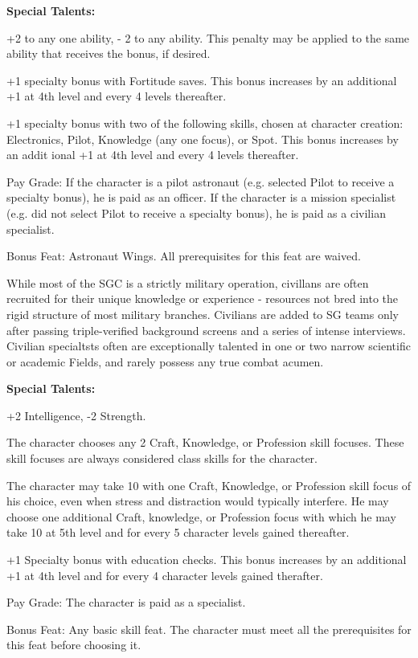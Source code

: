 \textbf{Special Talents:}
\begin{itemize*}
\item +2 to any one ability, - 2 to any ability. This penalty may be applied to the same ability that receives the bonus, if desired.
\item +1 specialty bonus with Fortitude saves. This bonus increases by an additional +1 at 4th level and every 4 levels thereafter.
\item +1 specialty bonus with two of the following skills, chosen at character creation: Electronics, Pilot, Knowledge (any one focus), or Spot. This bonus increases by an addit ional +1 at 4th level and every 4 levels thereafter.
\item Pay Grade: If the character is a pilot astronaut (e.g. selected Pilot to receive a specialty bonus), he is paid as an officer. If the character is a mission specialist (e.g. did not select Pilot to receive a specialty bonus), he is paid as a civilian specialist.
\item Bonus Feat: Astronaut Wings. All prerequisites for this feat are waived.
\end{itemize*}


While most of the SGC is a strictly military operation, civillans are often recruited for their unique knowledge or experience - resources not bred into the rigid structure of most military branches. Civilians are added to SG teams only after passing triple-verified background screens and a series of intense interviews. Civilian specialtsts often are exceptionally talented in one or two narrow scientific or academic Fields, and rarely possess any true combat acumen.

\textbf{Special Talents:}
\begin{itemize*}
\item +2 Intelligence, -2 Strength.
\item The character chooses any 2 Craft, Knowledge, or Profession skill focuses. These skill focuses are always considered class skills for the character.
\item The character may take 10 with one Craft, Knowledge, or Profession skill focus of his choice, even when stress and distraction would typically interfere. He may choose one additional Craft, knowledge, or Profession focus with which he may take 10 at 5th level and for every 5 character levels gained thereafter.
\item +1 Specialty bonus with education checks. This bonus increases by an additional +1 at 4th level and for every 4 character levels gained therafter.
\item Pay Grade: The character is paid as a specialist.
\item Bonus Feat: Any basic skill feat. The character must meet all the prerequisites for this feat before choosing it.
\end{itemize*}

